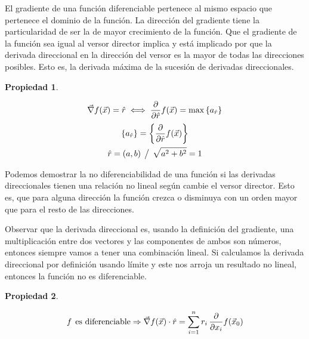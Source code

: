 \documentclass[a5paper,12pt,twoside]{book}
\newtheorem{prop}{{Propiedad}}[chapter]
\begin{document}
El gradiente de una función diferenciable pertenece al mismo espacio que pertenece el dominio de la función.
La dirección del gradiente tiene la particularidad de ser la de mayor crecimiento de la función.
Que el gradiente de la función sea igual al versor director implica y está implicado por que la derivada direccional en la dirección del versor es la mayor de todas las direcciones posibles.
Esto es, la derivada máxima de la sucesión de derivadas direccionales.

\begin{mdframed}[style=PropertyFrame]
    \begin{prop}
    \end{prop}
    \begin{equation*}
        \Vec{\nabla} f(\Vec{x}) = \hat{r} \iff \frac{\partial}{\partial \hat{r}} f(\Vec{x}) = \operatorname{max} { \left\{ { a_{\hat{r}} } \right\} }
    \end{equation*}
    \begin{gather*}
        { \left\{ { a_{\hat{r}} } \right\} } = { \left\{ { \frac{\partial}{\partial \hat{r}} f(\Vec{x}) } \right\} }
        \\
        \hat{r} = (a,b) \hspace{1ex} \big/ \hspace{1ex} \sqrt{a^2 + b^2}=1
    \end{gather*}
\end{mdframed}

Podemos demostrar la no diferenciabilidad de una función si las derivadas direccionales tienen una relación no lineal según cambie el versor director.
Esto es, que para alguna dirección la función crezca o disminuya con un orden mayor que para el resto de las direcciones.

Observar que la derivada direccional es, usando la definición del gradiente, una multiplicación entre dos vectores y las componentes de ambos son números, entonces siempre vamos a tener una combinación lineal.
Si calculamos la derivada direccional por definición usando límite y este nos arroja un resultado no lineal, entonces la función no es diferenciable.

\begin{mdframed}[style=PropertyFrame]
    \begin{prop}
    \end{prop}
    \begin{equation*}
        f \hspace{1ex} \textrm{es diferenciable} \Rightarrow \Vec{\nabla} f(\Vec{x}) \cdot \hat{r} = \sum_{i=1}^n r_i \, \frac{\partial}{\partial x_i} f(\Vec{x}_0)
    \end{equation*}
\end{mdframed}
\end{document}
